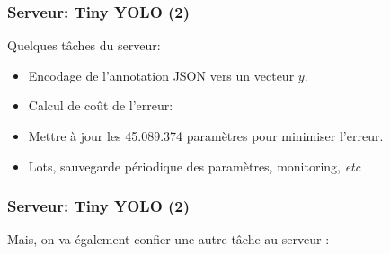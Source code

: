 \documentclass[11pt]{beamer}
\begin{document}
\begin{frame}
\frametitle{Serveur: Tiny YOLO (2)}
Quelques tâches du serveur:
\begin{itemize}
\item Encodage de l'annotation JSON vers un vecteur $y$.
\pause
\item Calcul de coût de l'erreur:
\end{itemize}
 \begin{center}
 \end{center}
\pause
\begin{itemize}
\item Mettre à jour les 45.089.374 paramètres pour minimiser l'erreur.
\pause
\item Lots, sauvegarde périodique des paramètres, monitoring, \emph{etc}
\end{itemize}
\end{frame}




\begin{frame}
\frametitle{Serveur: Tiny YOLO (2)}
Mais, on va également confier une autre tâche au serveur :
\begin{center}
\vspace{5mm}
\end{center}
\end{frame}
\end{document}
